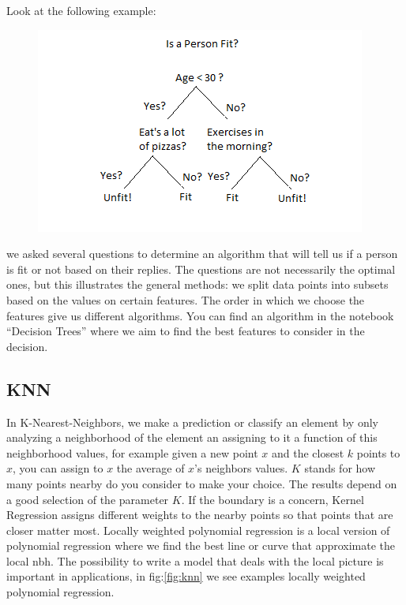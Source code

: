 \documentclass[11pt,letterpaper]{report}
\begin{document}
Look at the following example: 
 \begin{figure}[h!]
 	\centering
 	\includegraphics[width=0.45\linewidth]{figures/Decision-Trees.png}
 	\caption{}
 	\label{fig:Trees}
 \end{figure} 	
 
 we asked several questions to determine an algorithm that will tell us if a person is fit or not based on their replies. The questions are not necessarily the optimal ones, but this illustrates the general methods:  we split data points into subsets based on the values on certain features. The order in which we choose the features give us different algorithms. You can find an algorithm in the notebook ``Decision Trees'' where we aim to find the best features to consider in the decision.


 \subsection{KNN}
 In K-Nearest-Neighbors, we make a prediction or classify an element by  only analyzing  a neighborhood of the element an assigning to it a function of this neighborhood values, for example  given a new point $x$ and the closest $k$ points to $x$, you can assign to $x$ the average of $x$'s neighbors values.
 $K$ stands for how many points nearby do you consider to make your choice. The results depend on a good selection of the parameter $K$.  If the boundary is a concern,  Kernel Regression assigns different weights to the nearby points so that points that are closer matter most. Locally weighted polynomial  regression is a local version of polynomial regression where we find the best line or curve that approximate the local nbh.
  The possibility to write a model that deals with the local picture is important in applications, in fig:\ref{fig:knn} we see examples locally weighted polynomial regression.
 
\end{document}
